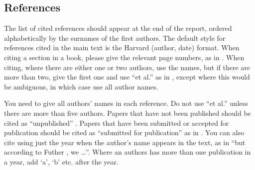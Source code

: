 \documentclass[12pt,a4paper]{article}
\begin{document}
\subsection{References}

The list of cited references should appear at the end of the report, ordered alphabetically by the surnames of the first authors.  The default style for references cited in the main text is the  Harvard (author, date) format.  When citing a section in a book, please give the relevant page numbers, as in \cite[p293]{budgen}.  When citing, where there are either one or two authors, use the names, but if there are more than two, give the first one and use ``et al.'' as in  , except where this would be ambiguous, in which case use all author names.

You need to give all authors' names in each reference.  Do not use ``et al.'' unless there are more than five authors.  Papers that have not been published should be cited as ``unpublished'' \cite{euther}.  Papers that have been submitted or accepted for publication should be cited as ``submitted for publication'' as in \cite{futher} .  You can also cite using just the year when the author's name appears in the text, as in ``but according to Futher \citeyear{futher}, we \dots''.  Where an authors has more than one publication in a year, add `a', `b' etc. after the year.





\end{document}
